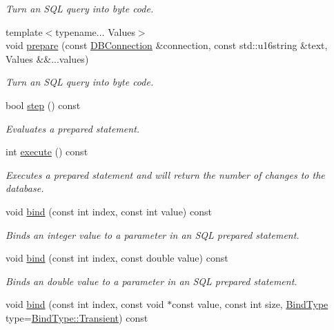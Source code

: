 \begin{DoxyCompactItemize}
\begin{DoxyCompactList}\small\item\em Turn an S\-Q\-L query into byte code. \end{DoxyCompactList}\item 
{\footnotesize template$<$typename... Values$>$ }\\void \hyperlink{a00013_a0d422eadca4b2e3f2e1b6e13af69f3cc}{prepare} (const \hyperlink{a00004}{D\-B\-Connection} \&connection, const std\-::u16string \&text, Values \&\&...values)
\begin{DoxyCompactList}\small\item\em Turn an S\-Q\-L query into byte code. \end{DoxyCompactList}\item 
bool \hyperlink{a00013_a6251d1119e978d1366113b4aa30899ef}{step} () const 
\begin{DoxyCompactList}\small\item\em Evaluates a prepared statement. \end{DoxyCompactList}\item 
int \hyperlink{a00013_a9b489a2dc2707543eba55ce1e5d3682c}{execute} () const 
\begin{DoxyCompactList}\small\item\em Executes a prepared statement and will return the number of changes to the database. \end{DoxyCompactList}\item 
void \hyperlink{a00013_a0d4999fce90145852287c18c0d218ac6}{bind} (const int index, const int value) const 
\begin{DoxyCompactList}\small\item\em Binds an integer value to a parameter in an S\-Q\-L prepared statement. \end{DoxyCompactList}\item 
void \hyperlink{a00013_ace8156c735b1e630e82a3840910e02cf}{bind} (const int index, const double value) const 
\begin{DoxyCompactList}\small\item\em Binds an double value to a parameter in an S\-Q\-L prepared statement. \end{DoxyCompactList}\item 
void \hyperlink{a00013_aab00e4b2d9a0d85ccaf2b058d0cc9523}{bind} (const int index, const void $\ast$const value, const int size, \hyperlink{a00038_a32877e51b309dd8f2a28c21c0ba4a6fd}{Bind\-Type} type=\hyperlink{a00038_a32877e51b309dd8f2a28c21c0ba4a6fdab1f023eff9a6b5308d6024e4c6b3d475}{Bind\-Type\-::\-Transient}) const 

\end{DoxyCompactItemize}
